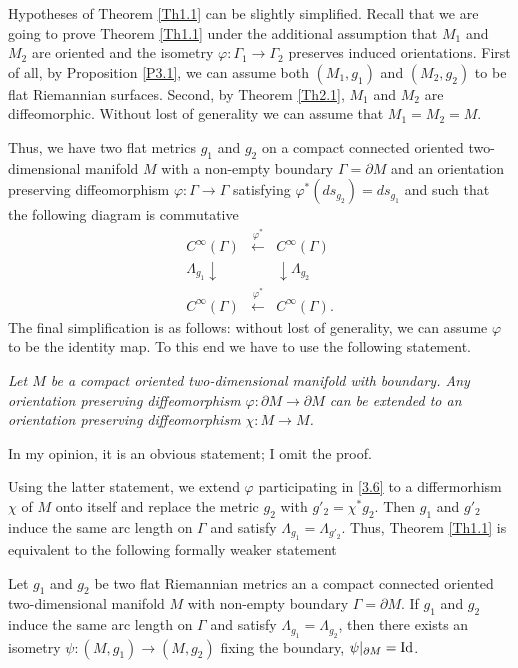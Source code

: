\documentclass[12pt,reqno]{amsart}
\begin{document}
Hypotheses of Theorem \ref{Th1.1} can be slightly simplified. Recall that we are going to prove Theorem \ref{Th1.1} under the additional assumption that $M_1$ and $M_2$ are oriented and the isometry $\varphi:\Gamma_1\to\Gamma_2$ preserves induced orientations. First of all, by Proposition \ref{P3.1}, we can assume both $(M_1,g_1)$ and $(M_2,g_2)$ to be flat Riemannian surfaces. Second, by Theorem \ref{Th2.1}, $M_1$ and $M_2$ are diffeomorphic. Without lost of generality we can assume that $M_1=M_2=M$.

Thus, we have two flat metrics $g_1$ and $g_2$ on a compact connected oriented two-dimensional manifold $M$ with a non-empty boundary $\Gamma=\partial M$ and an orientation preserving diffeomorphism $\varphi:\Gamma\to\Gamma$ satisfying $\varphi^*(ds_{g_2})=ds_{g_1}$ and such that the following diagram is commutative
\begin{equation}
\begin{array}{ccc}
C^\infty(\Gamma)&\stackrel{\varphi^*}\longleftarrow&C^\infty(\Gamma)\\
\Lambda_{g_1}\downarrow&&\downarrow\Lambda_{g_2}\\
C^\infty(\Gamma)&\stackrel{\varphi^*}\longleftarrow&C^\infty(\Gamma).
\end{array}
                                \label{3.6}
\end{equation}
The final simplification is as follows: without lost of generality, we can assume $\varphi$ to be the identity map. To this end we have to use the following statement.

{\it Let $M$ be a compact oriented two-dimensional manifold with boundary. Any orientation preserving diffeomorphism
$\varphi:\partial M\to\partial M$ can be extended to an orientation preserving diffeomorphism
$\chi:M\to M$.}

In my opinion, it is an obvious statement; I omit the proof.

Using the latter statement, we extend $\varphi$ participating in \eqref{3.6} to a differmorhism $\chi$ of $M$ onto itself and replace the metric $g_2$ with $g'_2=\chi^*g_2$. Then $g_1$ and $g'_2$ induce the same arc length on $\Gamma$ and satisfy $\Lambda_{g_1}=\Lambda_{g'_2}$.
Thus, Theorem \ref{Th1.1} is equivalent to the following formally weaker statement

\begin{theorem} \label{Th3.3}
Let $g_1$ and $g_2$ be two flat Riemannian metrics an a compact connected oriented two-dimensional manifold $M$ with non-empty boundary $\Gamma=\partial M$. If $g_1$ and $g_2$ induce the same arc length on $\Gamma$ and satisfy $\Lambda_{g_1}=\Lambda_{g_2}$, then there exists an  isometry $\psi:(M,g_1)\to (M,g_2)$ fixing the boundary, $\psi|_{\partial M}=\mbox{\rm Id}$.
\end{theorem}
\end{document}
